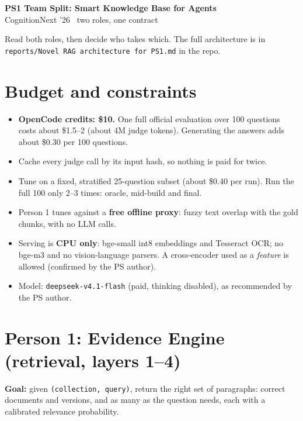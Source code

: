 \documentclass[11pt,a4paper]{article}
\newcommand{\role}[1]{\section*{\color{accent}#1}}
\begin{document}
{\LARGE\bfseries\color{accent} PS1 Team Split: Smart Knowledge Base for Agents}\\[2pt]
{\large CognitionNext '26 \textbullet\ two roles, one contract}

\vspace{6pt}
Read both roles, then decide who takes which. The full architecture is in
\texttt{reports/Novel RAG architecture for PS1.md} in the repo.

\section*{Budget and constraints}
\begin{itemize}
  \item \textbf{OpenCode credits: \$10.} One full official evaluation over 100 questions costs about
        \$1.5--2 (about 4M judge tokens). Generating the answers adds about \$0.30 per 100 questions.
  \item Cache every judge call by its input hash, so nothing is paid for twice.
  \item Tune on a fixed, stratified 25-question subset (about \$0.40 per run). Run the full 100 only
        2--3 times: oracle, mid-build and final.
  \item Person 1 tunes against a \textbf{free offline proxy}: fuzzy text overlap with the gold
        chunks, with no LLM calls.
  \item Serving is \textbf{CPU only}: bge-small int8 embeddings and Tesseract OCR; no bge-m3 and no
        vision-language parsers. A cross-encoder used as a \emph{feature} is allowed (confirmed by
        the PS author).
  \item Model: \texttt{deepseek-v4.1-flash} (paid, thinking disabled), as recommended by the PS author.
\end{itemize}

\role{Person 1: Evidence Engine (retrieval, layers 1--4)}

\textbf{Goal:} given \texttt{(collection, query)}, return the right set of paragraphs: correct
documents and versions, and as many as the question needs, each with a calibrated relevance
probability.
\end{document}
